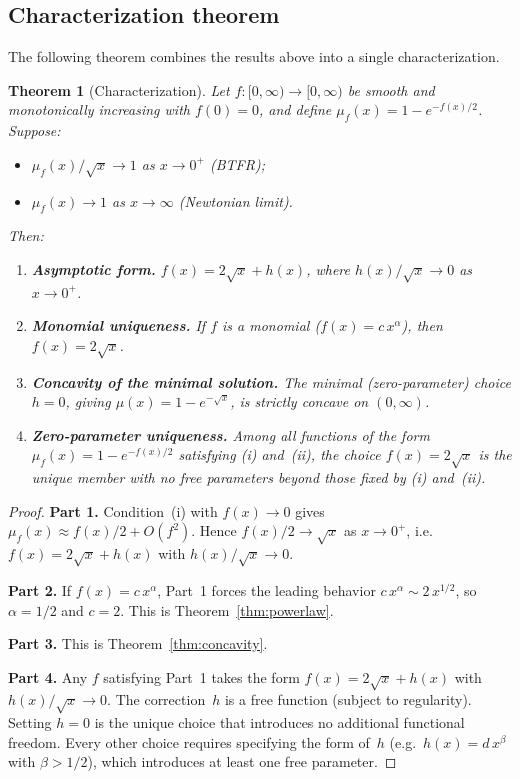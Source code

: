 \documentclass[prd,twocolumn,superscriptaddress,longbibliography,floatfix]{revtex4-2}
\newtheorem{theorem}{Theorem}
\begin{document}
\subsection{Characterization theorem}
\label{sec:characterization}

The following theorem combines the results above into a single
characterization.

\begin{theorem}[Characterization]
\label{thm:characterization}
Let $f\colon [0,\infty) \to [0,\infty)$ be smooth and monotonically
increasing with $f(0) = 0$, and define
$\mu_{f}(x) = 1 - e^{-f(x)/2}$.  Suppose:
\begin{itemize}
  \item[\textup{(i)}] $\mu_{f}(x)/\sqrt{x} \to 1$ as $x \to 0^{+}$
    \textup{(BTFR)};
  \item[\textup{(ii)}] $\mu_{f}(x) \to 1$ as $x \to \infty$
    \textup{(Newtonian limit)}.
\end{itemize}
Then:
\begin{enumerate}
  \item \textbf{Asymptotic form.}
    $f(x) = 2\sqrt{x} + h(x)$, where $h(x)/\sqrt{x} \to 0$
    as $x \to 0^{+}$.
  \item \textbf{Monomial uniqueness.}
    If $f$ is a monomial ($f(x) = c\,x^{\alpha}$), then
    $f(x) = 2\sqrt{x}$.
  \item \textbf{Concavity of the minimal solution.}
    The minimal (zero-parameter) choice $h = 0$, giving
    $\mu(x) = 1 - e^{-\sqrt{x}}$, is strictly concave on
    $(0,\infty)$.
  \item \textbf{Zero-parameter uniqueness.}
    Among all functions of the form
    $\mu_{f}(x) = 1 - e^{-f(x)/2}$ satisfying \textup{(i)}
    and~\textup{(ii)}, the choice $f(x) = 2\sqrt{x}$ is the unique
    member with no free parameters beyond those fixed by
    \textup{(i)} and~\textup{(ii)}.
\end{enumerate}
\end{theorem}

\begin{proof}
\textbf{Part 1.}
Condition~(i) with $f(x) \to 0$ gives
$\mu_{f}(x) \approx f(x)/2 + O(f^2)$.  Hence $f(x)/2 \to \sqrt{x}$
as $x \to 0^{+}$, i.e.\ $f(x) = 2\sqrt{x} + h(x)$ with
$h(x)/\sqrt{x} \to 0$.

\textbf{Part 2.}
If $f(x) = c\,x^{\alpha}$, Part~1 forces the leading behavior
$c\,x^{\alpha} \sim 2\,x^{1/2}$, so $\alpha = 1/2$ and $c = 2$.
This is Theorem~\ref{thm:powerlaw}.

\textbf{Part 3.}
This is Theorem~\ref{thm:concavity}.

\textbf{Part 4.}
Any $f$ satisfying Part~1 takes the form $f(x) = 2\sqrt{x} + h(x)$
with $h(x)/\sqrt{x} \to 0$.  The correction~$h$ is a free function
(subject to regularity).  Setting $h = 0$ is the unique choice that
introduces no additional functional freedom.  Every other choice
requires specifying the form of~$h$ (e.g.\ $h(x) = d\,x^{\beta}$
with $\beta > 1/2$), which introduces at least one free parameter.
\end{proof}
\end{document}
